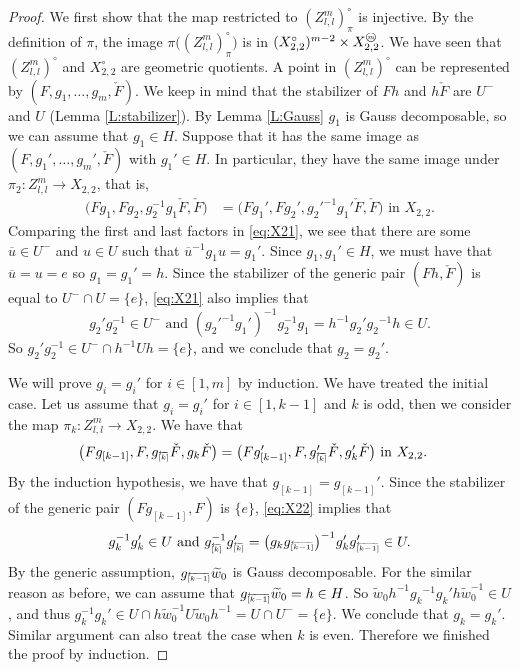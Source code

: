 \documentclass{amsart}
\theoremstyle{definition}
\theoremstyle{remark}
\numberwithin{equation}{section}
\newcommand{\br}[1]{\overline{#1}}
\newcommand{\wtd}[1]{\widetilde{#1}}
\newcommand{\zllm}{{Z_{l,l}^m}}
\newcommand{\invint}[1]{{\scriptsize \overleftarrow{[#1]}}}
\newcommand{\circm}{{\mathop{\text{\textcircled{\tiny \textit m}}}\nolimits}}
\begin{document}
\begin{proof} We first show that the map restricted to $(\zllm)^\circ_\pi$ is injective.
	By the definition of $\pi$, the image $\pi\big((\zllm)^\circ_\pi\big)$ is in $(X_{2,2}^\circ)^{m-2}\times X_{2,2}^{\circm}$.
	We have seen that $(\zllm)^\circ$ and $X_{2,2}^\circ$ are geometric quotients.
	A point in $(\zllm)^\circ$ can be represented by $(F,g_1,\dots,g_m,\check{F})$.
	We keep in mind that the stabilizer of $Fh$ and $h\check{F}$ are $U^-$ and $U$ (Lemma \ref{L:stabilizer}).
	By Lemma \ref{L:Gauss} $g_1$ is Gauss decomposable, so we can assume that $g_1\in H$.
	Suppose that it has the same image as $(F,g_1',\dots,g_m',\check{F})$ with $g_1'\in H$.
	In particular, they have the same image under $\pi_2: \zllm\to X_{2,2}$, that is,
	\begin{align} 
	\big(Fg_1,Fg_2,g_2^{-1}g_1\check{F},\check{F}\big)&=\big(Fg_1',Fg_2',{g_2'}^{-1}g_1'\check{F},\check{F}\big) \text{ in } X_{2,2}. \label{eq:X21}
	\end{align}
	Comparing the first and last factors in \eqref{eq:X21}, we see that there are some $\br{u}\in U^-$ and $u\in U$ such that
	$\br{u}^{-1}g_1u=g_1'$. 
	Since $g_1,g_1'\in H$, we must have that $\br{u}=u=e$ so $g_1=g_1'=h$.
	Since the stabilizer of the generic pair $(Fh,\check{F})$ is equal to $U^-\cap U=\{e\}$,
	\eqref{eq:X21} also implies that 
	$$g_2'g_2^{-1} \in U^- \text{ and } ({g_2'}^{-1}g_1')^{-1}g_2^{-1}{g_1}=h^{-1}g_2'{g_2}^{-1}h \in U.$$
	So $g_2'g_2^{-1}\in U^-\cap h^{-1}Uh=\{e\}$, and we conclude that $g_2=g_2'$.
	
	We will prove $g_i=g_i'$ for $i\in [1,m]$ by induction. We have treated the initial case.
	Let us assume that $g_i=g_i'$ for $i\in [1,k-1]$ and $k$ is odd, then we consider the map 
	$\pi_{k}: \zllm\to X_{2,2}$.
	We have that \begin{align}  \label{eq:X22} 
	\big(Fg_{[k-1]},F,g_{\invint{k}}\check{F},g_k\check{F}\big)&=\big(Fg_{[k-1]}',F,g_{\invint{k}}'\check{F},g_k'\check{F}\big) \text{ in } X_{2,2}.
	\end{align}
	By the induction hypothesis, we have that $g_{[k-1]}=g_{[k-1]}'$.
	Since the stabilizer of the generic pair $(Fg_{[k-1]},F)$ is $\{e\}$,
	\eqref{eq:X22} implies that 
	$$g_k^{-1}g_k' \in U \text{ and } g_{\invint{k}}^{-1}g_{\invint{k}}'=\big(g_kg_{\invint{k-1}}\big)^{-1}g_k'g_{\invint{k-1}}'\in U.$$
	By the generic assumption, $g_{\invint{k-1}} \wtd{w}_0$ is Gauss decomposable.
	For the similar reason as before, we can assume that $g_{\invint{k-1}}\wtd{w}_0=h\in H$.
	So $\wtd{w}_0h^{-1} {g_k}^{-1}g_k' h\wtd{w}_0^{-1} \in U$, and thus $g_k^{-1}g_k'\in U\cap h\wtd{w}_0^{-1}U\wtd{w}_0h^{-1}=U\cap U^-=\{e\}$.
	We conclude that $g_k=g_k'$.
	Similar argument can also treat the case when $k$ is even.
	Therefore we finished the proof by induction.


\end{proof}
\end{document}
